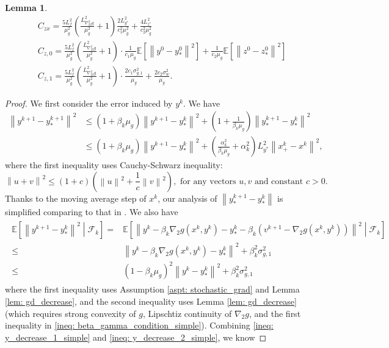 \documentclass[10pt]{article}
\newtheorem{lemma}{Lemma}[section]
\theoremstyle{remark}
\def\setF{\mathscr{F}} %
\newcommand{\E}{\mathbb{E}}
\newcommand{\norm}[1]{\left\|#1\right\|}
\begin{document}
\begin{lemma}
\begin{align*}
         &C_{zx} = \frac{5L_f^2}{\mu_g^2}\left(\frac{L_{\nabla_{22}^2g}^2}{\mu_g^2} + 1\right)\frac{2L_{y^*}^2}{c_1^2\mu_g^2} + \frac{4L_{z^*}^2}{c_2^2\mu_g^2}\\
         &C_{z,0} = \frac{5L_f^2}{\mu_g^2}\left(\frac{L_{\nabla_{22}^2g}^2}{\mu_g^2} + 1\right)\cdot\frac{1}{c_1\mu_g}\E\left[\norm{y^0 - y_*^0}^2\right] + \frac{1}{c_2\mu_g}\E\left[\norm{z^0 - z_*^0}^2\right]\\
         &C_{z,1} = \frac{5L_f^2}{\mu_g^2}\left(\frac{L_{\nabla_{22}^2g}^2}{\mu_g^2} + 1\right)\cdot\frac{2c_1\sigma_{g,1}^2}{\mu_g} + \frac{2c_2\sigma_w^2}{\mu_g}.
    \end{align*}
\end{lemma}

\begin{proof}
    We first consider the error induced by $y^k$. We have
\begin{equation}\label{ineq: y_decrease_1_simple}
    \begin{aligned}
        \norm{y^{k+1} - y_*^{k+1}}^2 &\leq \left(1 + \beta_k\mu_g\right)\norm{y^{k+1} - y_*^k}^2 + \left(1 + \frac{1}{\beta_k\mu_g}\right)\norm{y_*^{k+1} - y_*^k}^2 \\
        &\leq \left(1 + \beta_k\mu_g\right)\norm{y^{k+1} - y_*^k}^2 + \left(\frac{\alpha_k^2}{\beta_k\mu_g} + \alpha_k^2\right)L_{y^*}^2\norm{x_+^k - x^k}^2,
    \end{aligned}
\end{equation}
where the first inequality uses Cauchy-Schwarz inequality:
\[
    \norm{u + v}^2 \leq (1 + c)\left(\norm{u}^2 + \frac{1}{c}\norm{v}^2\right), \text{ for any vectors } u, v \text{ and constant }c>0.
\]
Thanks to the moving average step of $x^k$, our analysis of $\norm{y_*^{k+1} - y_*^k}$ is simplified comparing to that in \cite{chen2021closing}. We also have
\begin{align}\label{ineq: y_decrease_2_simple}
    \begin{aligned}
        \E\left[\norm{y^{k+1} - y_*^k}^2\middle|\setF_k\right] = &\E\left[\norm{y^k - \beta_k\nabla_2g(x^k, y^k) - y_*^k - \beta_k(v^{k+1} - \nabla_2g(x^k, y^k))}^2\middle|\setF_k\right] \\
        \leq &\norm{y^k - \beta_k\nabla_2g(x^k, y^k) - y_*^k}^2 + \beta_k^2\sigma_{g,1}^2\\
        \leq &(1-\beta_k\mu_g)^2\norm{y^k - y_*^k}^2 + \beta_k^2\sigma_{g,1}^2
    \end{aligned}
\end{align}
where the first inequality uses Assumption \eqref{aspt: stochastic_grad} and Lemma \ref{lem: gd_decrease}, and the second inequality uses Lemma \ref{lem: gd_decrease} (which requires strong convexity of $g$, Lipschtiz continuity of $\nabla_2g$, and the first inequality in \eqref{ineq: beta_gamma_condition_simple}). Combining \eqref{ineq: y_decrease_1_simple} and \eqref{ineq: y_decrease_2_simple}, we know

\end{proof}
\end{document}

